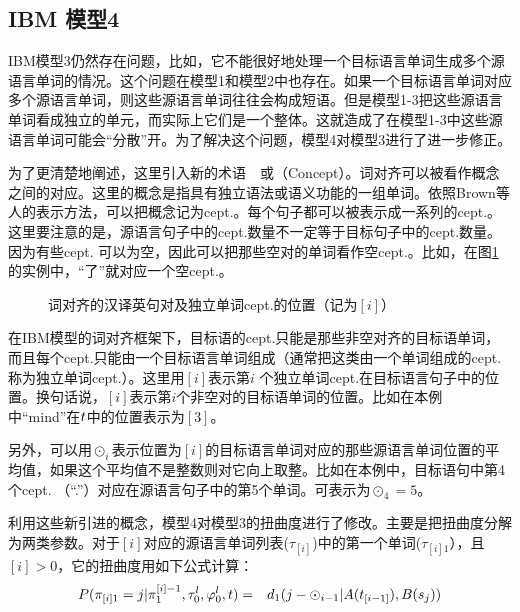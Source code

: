 
\subsection{IBM 模型4}

\parinterval IBM模型3仍然存在问题，比如，它不能很好地处理一个目标语言单词生成多个源语言单词的情况。这个问题在模型1和模型2中也存在。如果一个目标语言单词对应多个源语言单词，则这些源语言单词往往会构成短语。但是模型1-3把这些源语言单词看成独立的单元，而实际上它们是一个整体。这就造成了在模型1-3中这些源语言单词可能会“分散”开。为了解决这个问题，模型4对模型3进行了进一步修正。

\parinterval 为了更清楚地阐述，这里引入新的术语\ \dash \ {\small{}}或{\small{}}（Concept）。词对齐可以被看作概念之间的对应。这里的概念是指具有独立语法或语义功能的一组单词。依照Brown等人的表示方法，可以把概念记为cept.。每个句子都可以被表示成一系列的cept.。这里要注意的是，源语言句子中的cept.数量不一定等于目标句子中的cept.数量。因为有些cept. 可以为空，因此可以把那些空对的单词看作空cept.。比如，在图\ref{fig:6-8}的实例中，“了”就对应一个空cept.。

\begin{figure}[htp]
    \centering

   \caption{词对齐的汉译英句对及独立单词cept.的位置（记为$[i]$）}
   \label{fig:6-8}
\end{figure}

\parinterval 在IBM模型的词对齐框架下，目标语的cept.只能是那些非空对齐的目标语单词，而且每个cept.只能由一个目标语言单词组成（通常把这类由一个单词组成的cept.称为独立单词cept.）。这里用$[i]$表示第$i$ 个独立单词cept.在目标语言句子中的位置。换句话说，$[i]$表示第$i$个非空对的目标语单词的位置。比如在本例中“mind”在${t}$中的位置表示为$[3]$。

\parinterval 另外，可以用$\odot_{i}$表示位置为$[i]$的目标语言单词对应的那些源语言单词位置的平均值，如果这个平均值不是整数则对它向上取整。比如在本例中，目标语句中第4个cept. （“.”）对应在源语言句子中的第5个单词。可表示为${\odot}_{4}=5$。

\parinterval 利用这些新引进的概念，模型4对模型3的扭曲度进行了修改。主要是把扭曲度分解为两类参数。对于$[i]$对应的源语言单词列表($\tau_{[i]}$)中的第一个单词($\tau_{[i]1}$），且$[i]>0$，它的扭曲度用如下公式计算：
\begin{eqnarray}
{P}(\pi_{[i]1}=j|{\pi}_1^{[i]-1},{\tau}_0^l,{\varphi}_0^l,{t}) & = & d_{1}(j-{\odot}_{i-1}|A(t_{[i-1]}),B(s_j))
\label{eq:6-22}
\end{eqnarray}

